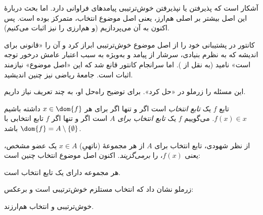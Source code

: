 \documentclass[../../../include/open-logic-section]{subfiles}
\begin{document}

آشکار است که پذیرفتن یا نپذیرفتن خوش‌ترتیبی پیامدهای فراوانی دارد.
اما بحث دربارهٔ این اصل بیشتر بر اصلی هم‌ارز، یعنی اصل موضوع انتخاب،
متمرکز بوده است. پس اکنون به آن می‌پردازیم (و هم‌ارزی را نیز اثبات
می‌کنیم).

کانتور در \citeyear{Cantor1883} پشتیبانی خود را از اصل موضوع
خوش‌ترتیبی ابراز کرد و آن را «قانونی برای اندیشه که به نظرم بنیادی،
سرشار از پیامد و به‌ویژه به سبب اعتبار عامش درخور توجه است» نامید
(به نقل از \citeauthor{Potter2004}
\citeyear[p.~243]{Potter2004}). اما سرانجام کانتور قانع شد که این
«اصل موضوع» نیازمند اثبات است. جامعهٔ ریاضی نیز چنین اندیشید.

این مسئله را زرملو در \citeyear{Zermelo1904} «حل کرد». برای توضیح
راه‌حل او، به چند تعریف نیاز داریم.

\begin{defn}
تابع $f$ یک \emph{تابع انتخاب} است اگر و تنها اگر برای هر
$x \in \dom{f}$ داشته باشیم $f(x) \in x$. می‌گوییم $f$ یک
\emph{تابع انتخاب برای $A$} است اگر و تنها اگر $f$ تابع انتخابی با
$\dom{f} = A \setminus \{\emptyset\}$ باشد.
\end{defn}

از نظر شهودی، تابع انتخاب برای $A$ از هر مجموعهٔ (ناتهیِ)
$x \in A$ یک عضو مشخص، یعنی $f(x)$، را \emph{برمی‌گزیند}. اکنون اصل
موضوع انتخاب چنین است:

\begin{axiom}[انتخاب]
	هر مجموعه دارای یک تابع انتخاب است.
\end{axiom}

زرملو نشان داد که انتخاب مستلزم خوش‌ترتیبی است و برعکس:

\begin{thm}[در $\ZF$]
خوش‌ترتیبی و انتخاب هم‌ارزند.
\end{thm}
\end{document}
